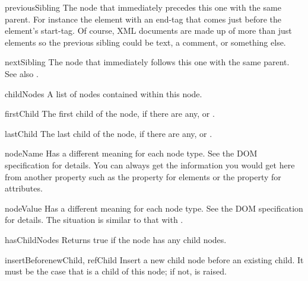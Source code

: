 \begin{memberdesc}[Node]{previousSibling}
The node that immediately precedes this one with the same parent.  For
instance the element with an end-tag that comes just before the
 element's start-tag.  Of course, XML documents are made
up of more than just elements so the previous sibling could be text, a
comment, or something else.
\end{memberdesc}

\begin{memberdesc}[Node]{nextSibling}
The node that immediately follows this one with the same parent.  See
also .
\end{memberdesc}

\begin{memberdesc}[Node]{childNodes}
A list of nodes contained within this node.
\end{memberdesc}

\begin{memberdesc}[Node]{firstChild}
The first child of the node, if there are any, or .
\end{memberdesc}

\begin{memberdesc}[Node]{lastChild}
The last child of the node, if there are any, or .
\end{memberdesc}

\begin{memberdesc}[Node]{nodeName}
Has a different meaning for each node type.  See the DOM specification
for details.  You can always get the information you would get here
from another property such as the  property for
elements or the  property for attributes.
\end{memberdesc}

\begin{memberdesc}[Node]{nodeValue}
Has a different meaning for each node type.  See the DOM specification
for details.  The situation is similar to that with .
\end{memberdesc}

\begin{methoddesc}[Node]{hasChildNodes}{}
Returns true if the node has any child nodes.
\end{methoddesc}

\begin{methoddesc}[Node]{insertBefore}{newChild, refChild}
Insert a new child node before an existing child.  It must be the case
that  is a child of this node; if not,
 is raised.
\end{methoddesc}

